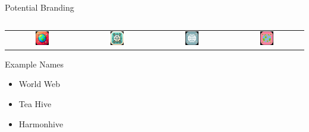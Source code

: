\documentclass[aspectratio=169]{beamer}
\begin{document}
\begin{frame}{Potential Branding}
\begin{columns}[T]
\begin{column}{0.5\textwidth}
\begin{tabular}{cccc}
            \includegraphics[width=0.2\textwidth]{imgs/app_icons/3.png} & \includegraphics[width=0.2\textwidth]{imgs/app_icons/4.png} & \includegraphics[width=0.2\textwidth]{imgs/app_icons/5.png} & \includegraphics[width=0.2\textwidth]{imgs/app_icons/6.png}\\ 
        \end{tabular}
        Example Names
        \begin{itemize}
            \item World Web
            \item Tea Hive
            \item Harmonhive
        \end{itemize}
    \end{column}
\end{columns}
\end{frame}
\end{document}
